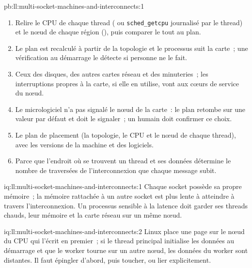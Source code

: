 \begin{solution}{pb:ll:multi-socket-machines-and-interconnects:1}
\begin{enumerate}
mémoire depuis ce thread~; éloigner les interruptions des autres périphériques des cœurs chauds~; vérifier le plan au démarrage et refuser de trader s'il échoue.
\item Relire le CPU de chaque thread ( ou \texttt{sched\_getcpu} journalisé par le thread) et
le nœud de chaque région (), puis comparer le tout au plan.
\item Le plan est recalculé à partir de la topologie et le processus suit la carte~; une vérification au démarrage le
détecte si personne ne le fait.
\item Ceux des disques, des autres cartes réseau et des minuteries~; les interruptions propres à la carte, si elle en
utilise, vont aux cœurs de service du nœud.
\item Le micrologiciel n'a pas signalé le nœud de la carte~: le plan retombe sur une valeur par défaut et doit le
signaler~; un humain doit confirmer ce choix.
\item Le plan de placement (la topologie, le CPU et le nœud de chaque thread), avec les versions de la machine et des logiciels.
\item Parce que l'endroit où se trouvent un thread et ses données détermine le nombre de traversées de l'interconnexion que chaque message subit.
\end{enumerate}
\end{solution}

\begin{solution}{iq:ll:multi-socket-machines-and-interconnects:1}
Chaque socket possède sa propre mémoire~; la mémoire rattachée à un autre socket est plus lente à atteindre à travers
l'interconnexion. Un processus sensible à la latence doit garder ses threads chauds, leur mémoire et la carte réseau sur un même nœud.
\end{solution}

\begin{solution}{iq:ll:multi-socket-machines-and-interconnects:2}
Linux place une page sur le nœud du CPU qui l'écrit en premier~; si le thread principal initialise les données au
démarrage et que le worker tourne sur un autre nœud, les données du worker sont distantes. Il faut épingler d'abord, puis toucher, ou lier explicitement.
\end{solution}

